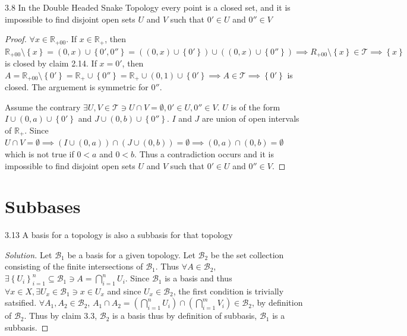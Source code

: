 \documentclass{article}
\newcommand*{\T}{\mathcal{T}}
\newcommand*{\B}{\mathcal{B}}
\newcommand{\R}{\mathbb{R}}
\newenvironment{solution}
{\renewcommand\qedsymbol{$\blacksquare$}\begin{proof}[Solution]}
{\end{proof}}
\begin{document}
\begin{PROB}{3.8}\label{Problem 3.8.}
    In the Double Headed Snake Topology every point is a closed set, and it is impossible to find disjoint open sets $U$ and $V$ such that $0' \in U$ and $0'' \in V$    
\end{PROB}
\begin{proof}
    $\forall x \in \R_{+00}$. If $x \in \R_{+}$, then $\R_{+00} \setminus \left\{ x \right\} = (0, x) \cup \left\{ 0', 0'' \right\} = ((0, x) \cup \left\{ 0' \right\}) \cup \left((0, x) \cup \left\{ 0'' \right\}\right) \implies R_{+ 00} \setminus \left\{ x \right\} \in \T \implies \left\{ x \right\}$ is closed by claim 2.14. If $x = 0'$, then $A = \R_{+00} \setminus \left\{ 0' \right\}= \R_{+} \cup \left\{ 0'' \right\} = \R_{+} \cup (0, 1) \cup \left\{ 0' \right\} \implies A \in \T \implies \left\{ 0' \right\}$ is closed. The arguement is symmetric for $0''$.
    
    Assume the contrary $\exists U, V \in \T \ni U \cap V =\emptyset, 0' \in U, 0'' \in V$. $U$ is of the form $I \cup (0, a) \cup \left\{ 0' \right\}$ and $J \cup (0, b) \cup \left\{ 0'' \right\}$. $I$ and $J$ are union of open intervals of $\R_+$. Since $U \cap V = \emptyset \implies (I \cup (0, a)) \cap (J \cup (0, b)) = \emptyset \implies (0, a) \cap (0, b) = \emptyset$ which is not true if $0 < a$ and $0 < b$. Thus a contradiction occurs and it is impossible to find disjoint open sets $U$ and $V$ such that $0' \in U$ and $0'' \in V$.                     
\end{proof}

\bigskip

\pagebreak

\section*{Subbases}
\begin{PROB}{3.13}\label{Problem 3.13.}
    A basis for a topology is also a subbasis for that topology
\end{PROB}
\begin{solution}
    Let $\B_1$ be a basis for a given topology. Let $\B_2$ be the set collection consisting of the finite intersections of $\B_1$. Thus $\forall A \in \B_2$, $\exists \left\{ U_i \right\}_{i = 1}^{n} \subseteq \B_1 \ni A = \bigcap_{i = 1}^{n} U_i$. Since $\B_1$ is a basis and thus $\forall x \in X, \exists U_x \in \B_1 \ni x \in U_x $ and since $U_x \in \B_2$, the first condition is trivially satsified. $\forall A_1, A_2 \in \B_2$, $A_1 \cap A_2 = \left(\bigcap_{i = 1}^{n} U_i\right) \cap \left(\bigcap_{i = 1}^{m} V_i\right) \in \B_2$, by definition of $\B_2$. Thus by claim 3.3, $\B_2$ is a basis thus by definition of subbasis, $\B_1$ is a subbasis.               
\end{solution}
\end{document}
